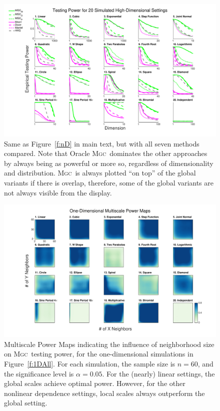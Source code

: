 \documentclass[11pt]{article}
\providecommand{\sct}[1]{{\normalfont\textsc{#1}}}
\newcommand{\Mgc}{\sct{Mgc}}
\begin{document}
\begin{figure}[htbp]
\includegraphics[width=1.0\textwidth]{Figures/FigHDPowerAll}
\caption{
Same as Figure~\ref{f:nD} in main text, but with all seven methods compared. Note that Oracle \Mgc~dominates the other approaches by always being as powerful or more so, regardless of dimensionality and distribution. \Mgc~is always plotted ``on top'' of the global variants if there is overlap, therefore, some of the global variants are not always visible from the display.}
%
%
%
\label{f:nDAll}
\end{figure}


\begin{figure}[htbp]
\includegraphics[width=1.0\textwidth]{Figures/Fig1DHeat}
\caption{Multiscale Power Maps indicating the influence of neighborhood size on \Mgc~testing power, for the one-dimensional simulations in Figure~\ref{f:1DAll}. For each simulation,  the sample size is $n=60$, and the significance level is $\alpha=0.05$. For the (nearly) linear settings, the global scales achieve optimal power.  However, for the other nonlinear dependence settings, local scales always outperform the global setting.}
\label{f:powermaps1}
\end{figure}
\end{document}
